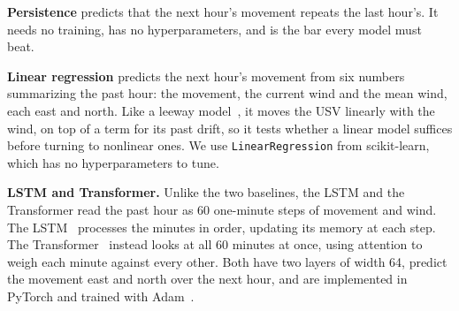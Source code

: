 \documentclass[sigconf]{acmart}
\begin{document}
\textbf{Persistence} predicts that the next hour's movement repeats the last hour's. It needs no training, has no hyperparameters, and is the bar every model must beat.

\textbf{Linear regression} predicts the next hour's movement from six numbers summarizing the past hour: the movement, the current wind and the mean wind, each east and north. Like a leeway model~\cite{breivik2011leeway}, it moves the USV linearly with the wind, on top of a term for its past drift, so it tests whether a linear model suffices before turning to nonlinear ones. We use \texttt{LinearRegression} from scikit-learn, which has no hyperparameters to tune.


\textbf{LSTM and Transformer.} Unlike the two baselines, the LSTM and the Transformer read the past hour as 60 one-minute steps of movement and wind. The LSTM~\cite{hochreiter1997lstm} processes the minutes in order, updating its memory at each step. The Transformer~\cite{vaswani2017attention} instead looks at all 60 minutes at once, using attention to weigh each minute against every other. Both have two layers of width 64, predict the movement east and north over the next hour, and are implemented in PyTorch and trained with Adam~\cite{kingma2015adam}.
\end{document}
